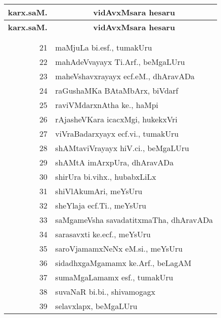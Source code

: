 \begin{center}
\qquad\quad
\begin{minipage}[t]{7cm}
{\renewcommand{\arraystretch}{1.5}
\begin{longtable}{rl}
\hline
{\bf karx.saM.} & \multicolumn{1}{c}{\bf vidAvxMsara hesaru}\\[3pt]
\hline
\endfirsthead
\hline
{\bf karx.saM.} & \multicolumn{1}{c}{\bf vidAvxMsara hesaru}\\[3pt]
\hline
  & \\[-10pt]
\endhead
\endfoot
\endlastfoot
  & \\[-10pt]
21 & maMjuLa bi.esf., tumakUru\\
22 & mahAdeVvayayx Ti.Arf., beMgaLUru\\
23 & maheVshavxrayayx ecf.eM., dhAravADa\\
24 & raGushaMKa BAtaMbArx, biVdarf\\
25 & raviVMdarxnAtha ke., haMpi\\
26 & rAjasheVKara icacxMgi, hukekxVri\\
27 & viVraBadarxyayx ecf.vi., tumakUru\\
28 & shAMtaviVrayayx hiV.ci., beMgaLUru\\
29 & shAMtA imArxpUra, dhAravADa\\
30 & shirUra bi.vihx., hubabxLiLx\\
31 & shiVlAkumAri, meYsUru\\
32 & sheYlaja ecf.Ti., meYsUru\\
33 & saMgameVsha savadatitxmaTha, dhAravADa\\
34 & sarasavxti ke.ecf., meYsUru\\
35 & saroVjamamxNeNx eM.si., meYsUru\\
36 & sidadhxgaMgamamx ke.Arf., beLagAM\\
37 & sumaMgaLamamx esf., tumakUru\\
38 & suvaNaR bi.bi., shivamogagx\\
39 &  selavxlapx, beMgaLUru\\
\end{longtable}}
\end{minipage}
\end{center}
